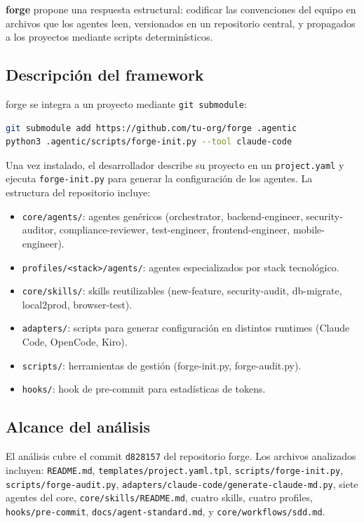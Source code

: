 \documentclass[12pt,a4paper]{article}
\begin{document}
\textbf{forge} propone una respuesta estructural: codificar las convenciones del equipo
en archivos que los agentes leen, versionados en un repositorio central, y propagados
a los proyectos mediante scripts determinísticos.

\subsection{Descripción del framework}

forge se integra a un proyecto mediante \texttt{git submodule}:

\begin{lstlisting}[language=bash, caption={Instalación básica de forge}]
git submodule add https://github.com/tu-org/forge .agentic
python3 .agentic/scripts/forge-init.py --tool claude-code
\end{lstlisting}

Una vez instalado, el desarrollador describe su proyecto en un \texttt{project.yaml}
y ejecuta \texttt{forge-init.py} para generar la configuración de los agentes.
La estructura del repositorio incluye:

\begin{itemize}
  \item \texttt{core/agents/}: agentes genéricos (orchestrator, backend-engineer,
        security-auditor, compliance-reviewer, test-engineer, frontend-engineer,
        mobile-engineer).
  \item \texttt{profiles/<stack>/agents/}: agentes especializados por stack tecnológico.
  \item \texttt{core/skills/}: skills reutilizables (new-feature, security-audit,
        db-migrate, local2prod, browser-test).
  \item \texttt{adapters/}: scripts para generar configuración en distintos runtimes
        (Claude Code, OpenCode, Kiro).
  \item \texttt{scripts/}: herramientas de gestión (forge-init.py, forge-audit.py).
  \item \texttt{hooks/}: hook de pre-commit para estadísticas de tokens.
\end{itemize}

\subsection{Alcance del análisis}

El análisis cubre el commit \texttt{d828157} del repositorio forge. Los archivos
analizados incluyen: \texttt{README.md}, \texttt{templates/project.yaml.tpl},
\texttt{scripts/forge-init.py}, \texttt{scripts/forge-audit.py},
\texttt{adapters/claude-code/generate-claude-md.py}, siete agentes del core,
\texttt{core/skills/README.md}, cuatro skills, cuatro profiles, \texttt{hooks/pre-commit},
\texttt{docs/agent-standard.md}, y \texttt{core/workflows/sdd.md}.
\end{document}
